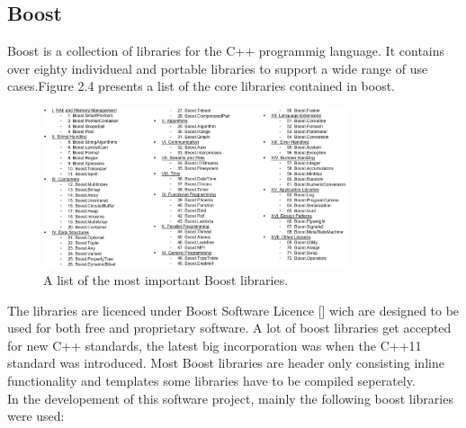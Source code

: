 \subsection{Boost}
Boost is a collection of libraries for the C++ programmig language. It contains over eighty individueal and portable libraries to support a wide range of use cases.Figure 2.4 presents a list of the core libraries contained in boost.
\begin{figure}[h]
\centering
      \includegraphics[width=0.8\textwidth]{boost}
        \caption{A list of the most important Boost libraries.}
\end{figure}
The libraries are licenced under Boost Software Licence [] wich are designed to be used for both free and proprietary software. A lot of boost libraries get accepted for new C++ standards, the latest big incorporation was when the C++11 standard was introduced. Most Boost libraries are header only consisting inline functionality and templates some libraries have to be compiled seperately.\\
In the developement of this software project, mainly the following boost libraries were used:

